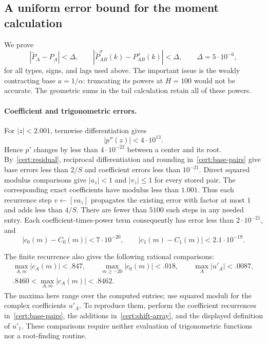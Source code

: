 \subsection{A uniform error bound for the moment calculation}
\label{cert:error}

We prove
\begin{equation}\label{cert:delta}
 |\widetilde P_A-P_A|<\Delta,
 \qquad
 |\widetilde P_{AB}^{\sigma}(k)-P_{AB}^{\sigma}(k)|<\Delta,
 \qquad \Delta=5\cdot10^{-6},
\end{equation}
for all types, signs, and lags used above.  The important issue is the
weakly contracting base $a=1/\alpha$: truncating its powers at $H=100$
would not be accurate.  The geometric sums in the tail calculation
retain all of these powers.

\paragraph{Coefficient and trigonometric errors.}
For $|z|<2.001$, termwise differentiation gives
\[
 |p''(z)|<4\cdot10^{13}.
\]
Hence $p'$ changes by less than $4\cdot10^{-22}$ between a center
and its root.  By~\eqref{cert:residual}, reciprocal differentiation
and rounding in~\eqref{cert:base-pairs} give base errors less than
$2/S$ and coefficient errors less than $10^{-21}$.  Direct squared
modulus comparisons give $|a_z|<1$ and $|v_z|\le1$ for every stored
pair.  The corresponding exact coefficients have modulus less than
$1.001$.  Thus each recurrence step $v\leftarrow[va_z]$ propagates
the existing error with factor at most $1$ and adds less than $4/S$.
There are fewer than $5100$ such steps in any needed entry.  Each
coefficient-times-power term consequently has error less than
$2\cdot10^{-21}$, and
\begin{equation}\label{cert:coefficient-errors}
 |c_0(m)-C_0(m)|<7\cdot10^{-20},\qquad
 |c_1(m)-C_1(m)|<2.1\cdot10^{-19}.
\end{equation}

The finite recurrence also gives the following rational comparisons:
\begin{equation}\label{cert:array-bounds}
 \begin{gathered}
 \max_{A,m}|c_A(m)|<.847,\qquad
 \max_{m\ge-20}|c_0(m)|<.018,\qquad
 \max_A|u'_A|<.0087,\\
 .8460<\max_{A,m}|c_A(m)|<.8462.
 \end{gathered}
\end{equation}
The maxima here range over the computed entries; use squared
moduli for the complex coefficients $u'_A$.  To reproduce them, perform
the coefficient recurrences in~\eqref{cert:base-pairs}, the additions
in~\eqref{cert:shift-array}, and the displayed definition of $u'_1$.
These comparisons require neither evaluation of trigonometric
functions nor a root-finding routine.

